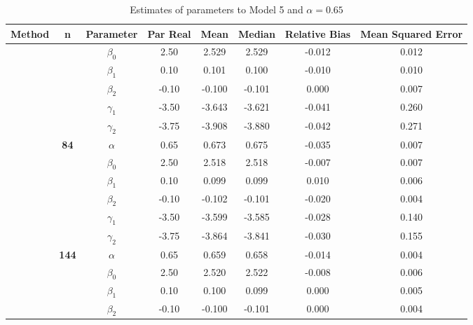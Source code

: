 \begin{table}[h]

\caption{\label{tab:Est_model_5_Alpha0.65}Estimates of parameters to Model 5 and $\alpha=0.65$}
\centering
\begin{tabular}[t]{>{}c>{}ccccccc}
\toprule
Method & n & Parameter & Par Real & Mean & Median & Relative Bias & Mean Squared Error\\
\midrule
 &  & $\beta_0$ & 2.50 & 2.529 & 2.529 & -0.012 & 0.012\\

 &  & $\beta_1$ & 0.10 & 0.101 & 0.100 & -0.010 & 0.010\\

 &  & $\beta_2$ & -0.10 & -0.100 & -0.101 & 0.000 & 0.007\\

 &  & $\gamma_1$ & -3.50 & -3.643 & -3.621 & -0.041 & 0.260\\

 &  & $\gamma_2$ & -3.75 & -3.908 & -3.880 & -0.042 & 0.271\\

 & \multirow{-6}{*}{\centering\arraybackslash \textbf{84}} & $\alpha$ & 0.65 & 0.673 & 0.675 & -0.035 & 0.007\\

 &  & $\beta_0$ & 2.50 & 2.518 & 2.518 & -0.007 & 0.007\\

 &  & $\beta_1$ & 0.10 & 0.099 & 0.099 & 0.010 & 0.006\\

 &  & $\beta_2$ & -0.10 & -0.102 & -0.101 & -0.020 & 0.004\\

 &  & $\gamma_1$ & -3.50 & -3.599 & -3.585 & -0.028 & 0.140\\

 &  & $\gamma_2$ & -3.75 & -3.864 & -3.841 & -0.030 & 0.155\\

 & \multirow{-6}{*}{\centering\arraybackslash \textbf{144}} & $\alpha$ & 0.65 & 0.659 & 0.658 & -0.014 & 0.004\\

 &  & $\beta_0$ & 2.50 & 2.520 & 2.522 & -0.008 & 0.006\\

 &  & $\beta_1$ & 0.10 & 0.100 & 0.099 & 0.000 & 0.005\\

 &  & $\beta_2$ & -0.10 & -0.100 & -0.101 & 0.000 & 0.004\\


\end{tabular}
\end{table}
